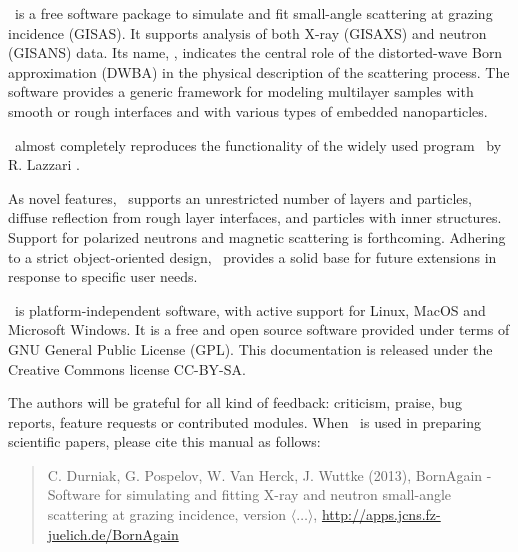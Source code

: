 \newpage
{}


\BornAgain\ is a free software package to simulate and fit small-angle
scattering at grazing incidence (GISAS). 
It supports analysis of both  X-ray (GISAXS) and neutron (GISANS) data.
Its name, \BornAgain, indicates the central role of the distorted-wave Born
approximation (DWBA) in the physical description of the
scattering process. The software provides a generic framework for modeling multilayer samples with smooth or
rough interfaces and with various types of embedded nano\-particles.

\BornAgain\ almost completely reproduces the functionality
of the widely used program \IsGISAXS\
by R. Lazzari \cite{Laz02}.

As novel features, \BornAgain\
supports an unrestricted number of layers and particles, 
diffuse reflection from rough layer interfaces,
and particles with inner structures.
Support for polarized neutrons and magnetic scattering is forthcoming.
Adhering to a strict object-oriented design,
\BornAgain\ provides a solid base for future extensions
in response to specific user needs.

\BornAgain\ is platform-independent software,
with active support for Linux, MacOS and 
Microsoft Windows. 
It is a free and open source software provided under terms
of GNU General Public License (GPL).
This documentation is released under the Creative Commons license CC-BY-SA.

The authors will be grateful for all kind of
feedback: criticism, praise, bug reports, feature requests
or contributed modules.
When \BornAgain\ is used in preparing scientific papers,
please cite this manual as follows: 
\begin{quote}
C. Durniak, G. Pospelov, W. Van Herck, J. Wuttke (2013),\newline
BornAgain - Software for simulating and fitting
X-ray and neutron small-angle scattering at grazing incidence,
version $\langle\ldots\rangle$,\newline
\url{http://apps.jcns.fz-juelich.de/BornAgain}
\end{quote}

